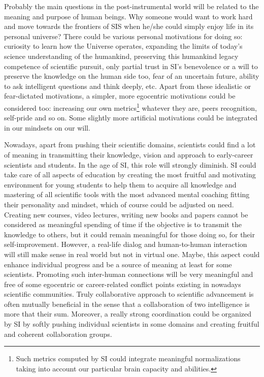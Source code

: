 \documentclass[a4paper,11pt]{article}
\begin{document}
    Probably the main questions in the post-instrumental world will be related to the meaning and purpose of human beings. Why someone would want to work hard and move towards the frontiers of SIS when he/she could simply enjoy life in its personal universe? There could be various personal motivations for doing so: curiosity to learn how the Universe operates, expanding the limits of today's science understanding of the humankind, preserving this  humankind legacy competence of scientific pursuit, only partial trust in SI's benevolence or a will to preserve the knowledge on the human side too, fear of an uncertain future, ability to ask intelligent questions and think deeply, etc. Apart from these idealistic or fear-dictated motivations, a simpler, more egocentric motivations could be considered too: increasing our own metrics\footnote{Such metrics computed by SI could integrate meaningful normalizations taking into account our particular brain capacity and abilities.} whatever they are, peers recognition, self-pride and so on.
    Some slightly more artificial motivations could be integrated in our mindsets on our will.

    Nowadays, apart from pushing their scientific domains, scientists could find a lot of meaning in transmitting their knowledge, vision and approach to early-career scientists and students. In the age of SI, this role will strongly diminish. SI could take care of all aspects of education by creating the most fruitful and motivating environment for young students to help them to acquire all knowledge and mastering of all scientific tools with the most advanced mental coaching fitting their personality and mindset, which of course could be adjusted on need. Creating new courses, video lectures, writing new books and papers cannot be considered as meaningful spending of time if the objective is to transmit the knowledge to others, but it could remain meaningful for those doing so, for their self-improvement. However, a real-life dialog and human-to-human interaction will still make sense in real world but not in virtual one. Maybe, this aspect could enhance individual progress and be a source of meaning at least for some scientists. Promoting such inter-human connections will be very meaningful and free of some egocentric or career-related conflict points existing in nowadays scientific communities. Truly collaborative approach to scientific advancement is often mutually beneficial in the sense that a collaboration of two intelligence is more that their sum. Moreover, a really strong coordination could be organized by SI by softly pushing individual scientists in some domains and creating fruitful and coherent collaboration groups.
\end{document}
